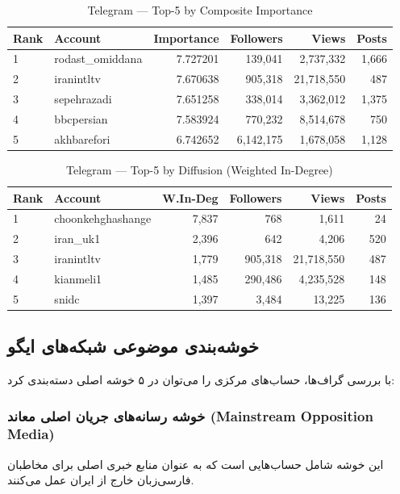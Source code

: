 \documentclass{article}
\begin{document}
\begin{table}[h!]
\centering
\begin{tabular}{llrrrr}
	\toprule
	Rank & Account & Importance & Followers & Views & Posts \\
	\midrule
	1 & rodast\_omiddana & 7.727201 & 139,041 & 2,737,332 & 1,666 \\
	2 & iranintltv       & 7.670638 & 905,318 & 21,718,550& 487 \\
	3 & sepehrazadi      & 7.651258 & 338,014 & 3,362,012 & 1,375 \\
	4 & bbcpersian       & 7.583924 & 770,232 & 8,514,678 & 750 \\
	5 & akhbarefori      & 6.742652 & 6,142,175& 1,678,058& 1,128 \\
	\bottomrule
\end{tabular}
\caption{Telegram — Top-5 by Composite Importance}
\end{table}


\begin{table}[h!]
\centering
\begin{tabular}{llrrrr}
	\toprule
	Rank & Account & W.In-Deg & Followers & Views & Posts \\
	\midrule
	1 & choonkehghashange & 7,837 & 768     & 1,611   & 24  \\
	2 & iran\_uk1         & 2,396 & 642     & 4,206   & 520 \\
	3 & iranintltv        & 1,779 & 905,318 & 21,718,550 & 487 \\
	4 & kianmeli1         & 1,485 & 290,486 & 4,235,528 & 148 \\
	5 & snidc             & 1,397 & 3,484   & 13,225  & 136 \\
	\bottomrule
\end{tabular}
\caption{Telegram — Top-5 by Diffusion (Weighted In-Degree)}
\end{table}
	
	

\subsection{خوشه‌بندی موضوعی شبکه‌های ایگو}
با بررسی گراف‌ها، حساب‌های مرکزی را می‌توان در ۵ خوشه اصلی دسته‌بندی کرد:

\subsubsection{خوشه رسانه‌های جریان اصلی معاند (Mainstream Opposition Media)}
این خوشه شامل حساب‌هایی است که به عنوان منابع خبری اصلی برای مخاطبان فارسی‌زبان خارج از ایران عمل می‌کنند.
\end{document}
